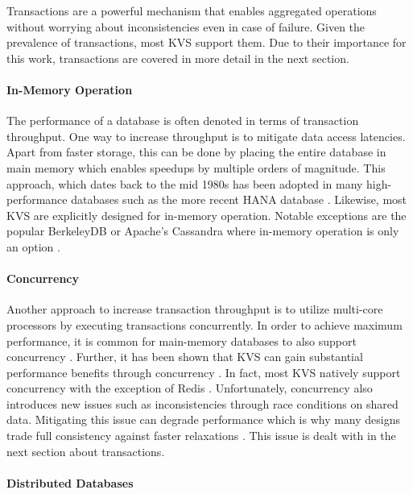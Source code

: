 Transactions are a powerful mechanism that enables aggregated operations without
worrying about inconsistencies even in case of failure. Given the prevalence of
transactions, most KVS support them. Due to their importance for this work,
transactions are covered in more detail in the next section.

\paragraph{In-Memory Operation}

The performance of a database is often denoted in terms of transaction
throughput. One way to increase throughput is to mitigate data access latencies.
Apart from faster storage, this can be done by placing the entire database in
main memory which enables speedups by multiple orders of magnitude. This
approach, which dates back to the mid 1980s has been adopted in many
high-performance databases such as the more recent HANA database
\cite{molina1992main, faerber2012hana}. Likewise, most KVS are explicitly
designed for in-memory operation. Notable exceptions are the popular BerkeleyDB
or Apache's Cassandra where in-memory operation is only an option
\cite{bdb2017doc, lakshman2010cassandra}.

\paragraph{Concurrency}

Another approach to increase transaction throughput is to utilize multi-core
processors by executing transactions concurrently. In order to achieve maximum
performance, it is common for main-memory databases to also support concurrency
\cite{grund2010hyrise, faerber2012hana, diaconu2013hekaton}. Further, it has
been shown that KVS can gain substantial performance benefits through
concurrency \cite{fan2013memc3, li2015architecting, xu2014building}. In fact,
most KVS natively support concurrency with the exception of Redis
\cite{redis2017home}. Unfortunately, concurrency also introduces new issues such
as inconsistencies through race conditions on shared data. Mitigating this issue
can degrade performance which is why many designs trade full consistency against
faster relaxations \cite{decandia2007dynamo}. This issue is dealt with in the
next section about transactions.

\paragraph{Distributed Databases}

